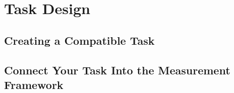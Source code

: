 \chapter{Task Design}\label{ch:task_design}

\section{Creating a Compatible Task}

\section{Connect Your Task Into the Measurement Framework}
